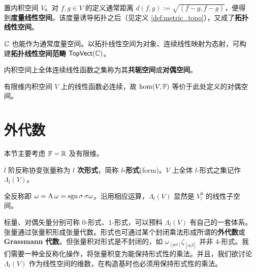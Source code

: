 \begin{definition}
    置内积空间 $V$。对 $f,g\in V$ 的定义通常距离 $d(f, g):=\sqrt{(f-g, f-g)}$，便得到\textbf{度量线性空间}。该度量诱导拓扑之后（见定义 \ref{def:metric_topo}），又成了\textbf{拓扑线性空间}。
\end{definition}

$\mathbb{C}$ 也能作为通常度量空间。以拓扑线性空间为对象、连续线性映射为态射，可构建\textbf{拓扑线性空间范畴} $\mathsf{TopVect}(\mathbb C)$。

\begin{definition}
    内积空间上全体连续线性函数之集称为其\textbf{共轭空间}或\textbf{对偶空间}。
\end{definition}
\begin{remark}
    有限维内积空间 $V$ 上的线性函数必连续，故 $\hom(V,\mathbb{F})$ 等价于此处定义的对偶空间。
\end{remark}

\section{外代数}

本节主要考虑 $\mathbb{F}=\mathbb{R}$ 及有限维。

\begin{definition}
    $l$ 阶反称协变张量称为 \textbf{$l$ 次形式}，简称 \textbf{$l$-形式}(form)。$V$ 上全体 $l$-形式之集记作 $\Lambda_l(V)$。
\end{definition}
\begin{remark}
    全反称即 $\omega=\operatorname{A}\omega=\operatorname{sgn}\sigma\,\sigma\omega$。沿用相应运算，$\Lambda_l(V)$ 显然是 $V^0_l$ 的线性子空间。
\end{remark}

标量、对偶矢量分别可称 0-形式、1-形式，可以预料 $\Lambda_l(V)$ 有自己的一套体系。张量通过张量积形成张量代数。形式也可通过某个封闭乘法形成所谓的\textbf{外代数}或 \textbf{Grassmann 代数}。但张量积对形式是不封闭的，如 $\omega_{[\mu\nu]}\zeta_{[\alpha\beta]}$ 并非 4-形式。我们需要一种全反称化操作，将张量积变为能保持形式性的乘法。并且，我们欲讨论 $\Lambda_l(V)$ 作为线性空间的维数，在构造基时也必须用保持形式性的乘法。

